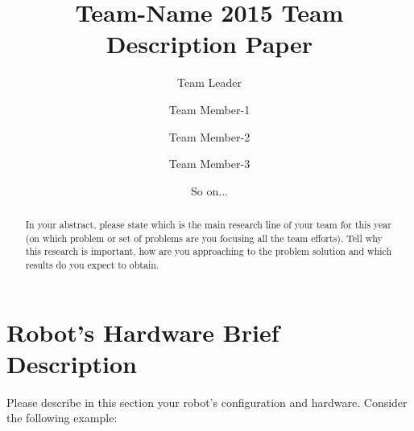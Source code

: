 \documentclass[runningheads,a4paper]{llncs}
\begin{document}
\title{Team-Name 2015 Team Description Paper}

\author{Team Leader \and Team Member-1 \and Team Member-2 \and Team Member-3 \and So on...}
\maketitle



\begin{abstract}

In your abstract, please state which is the main research line of your team for this year (on which problem or set of problems are you focusing all the team efforts). Tell why this research is important, how are you approaching to the problem solution and which results do you expect to obtain.

\end{abstract}



\section{Robot's Hardware Brief Description}
Please describe in this section your robot's configuration and hardware. Consider the following example:
\end{document}

